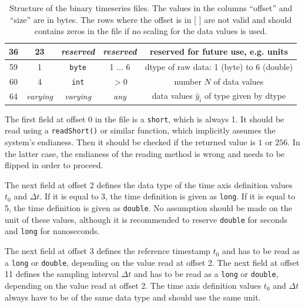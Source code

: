 \documentclass[a4paper,10pt]{article}
\begin{document}
\begin{table}[htbp]
\begin{tabular}{|c|c|c|c|c|}
    \hline                                                                                 
    36     & 23               & \textit{reserved}                & \textit{reserved} & reserved for future use, e.g. units \\
    \hline                                                                                 
    59     & 1                & \texttt{byte}                    & 1 ... 6           & dtype of raw data: 1 (byte) to 6 (double) \\
    \hline                                                              
    60     & 4                & \texttt{int}                     & $> 0$             & number $N$ of data values \\
    \hline
    64     & \textit{varying} & \textit{varying}                 & \textit{any}      & data values $\hat{y}_i$ of type given by dtype \\
    \hline
 \end{tabular}
 \caption{Structure of the binary timeseries files.
 The values in the columns ``offset'' and ``size'' are in bytes.
 The rows where the offset is in [ ] are not valid and should contains zeros in the file if no scaling for the data values is used.}
 \label{tab:structure}
\end{table}

The first field at offset 0 in the file is a \texttt{short}, which is always 1.
It should be read using a \texttt{readShort()} or similar function, which implicitly assumes the system's endianess.
Then it should be checked if the returned value is $1$ or $256$.
In the latter case, the endianess of the reading method is wrong and needs to be flipped in order to proceed.

The next field at offset 2 defines the data type of the time axis definition values $t_0$ and $\Delta t$.
If it is equal to 3, the time definition is given as \texttt{long}.
If it is equal to 5, the time definition is given as \texttt{double}.
No assumption should be made on the unit of these values, although it is recommended to reserve \texttt{double} for seconds and
\texttt{long} for nanoseconds.

The next field at offset 3 defines the reference timestamp $t_0$ and has to be read as a \texttt{long} or \texttt{double},
depending on the value read at offset 2.
The next field at offset 11 defines the sampling interval $\Delta t$ and has to be read as a \texttt{long} or \texttt{double},
depending on the value read at offset 2.
The time axis definition values $t_0$ and $\Delta t$ always have to be of the same data type and should use the same unit.
\end{document}
